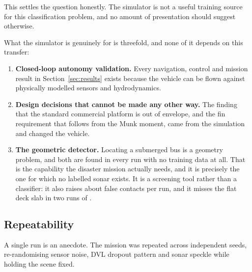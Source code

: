 \documentclass[10pt,a4paper]{article}
\begin{document}
This settles the question honestly. The simulator is not a useful training
source for this classification problem, and no amount of presentation should
suggest otherwise.

What the simulator is genuinely for is threefold, and none of it depends on
this transfer:

\begin{enumerate}[leftmargin=*,itemsep=2pt]
\item \textbf{Closed-loop autonomy validation.} Every navigation, control and
mission result in Section~\ref{sec:results} exists because the vehicle can be
flown against physically modelled sensors and hydrodynamics.
\item \textbf{Design decisions that cannot be made any other way.} The finding
that the standard commercial platform is out of envelope, and the fin
requirement that follows from the Munk moment, came from the simulation and
changed the vehicle.
\item \textbf{The geometric detector.} Locating a submerged bus is a geometry
problem, and both are found in every run with no training data at all. That is
the capability the disaster mission actually needs, and it is precisely the one
for which no labelled sonar exists. It is a screening tool rather than a
classifier: it also raises about \detFalseAlarms{} false contacts per run, and
it misses the flat deck slab in two runs of \detRuns{}.
\end{enumerate}

\subsection{Repeatability}

A single run is an anecdote. The mission was repeated across \repRuns{}
independent seeds, re-randomising sensor noise, DVL dropout pattern and sonar
speckle while holding the scene fixed.
\end{document}
